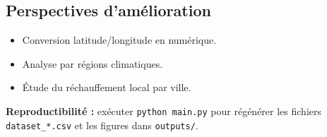 \documentclass[10pt,a4paper]{article}
\begin{document}
\subsection{Perspectives d'amélioration}
\begin{itemize}
\item Conversion latitude/longitude en numérique.
\item Analyse par régions climatiques.
\item Étude du réchauffement local par ville.
\end{itemize}

\vspace{0.2cm}
\colorbox{boxcolor}{\parbox{0.96\textwidth}{\footnotesize\textbf{Reproductibilité :} exécuter \texttt{python main.py} pour régénérer les fichiers \texttt{dataset\_*.csv} et les figures dans \texttt{outputs/}.}}
\end{document}
